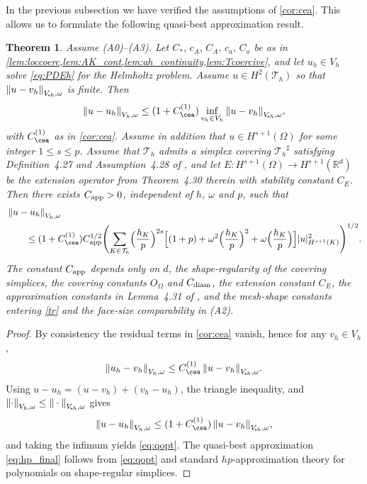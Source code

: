 \documentclass[11pt]{article}
\newenvironment{eqs} %
 { \begin{equation} \begin{aligned} } %
 { \end{aligned} \end{equation} \ignorespacesafterend } %
\theoremstyle{definition}
\theoremstyle{plain}
\newtheorem{theorem}{Theorem}[section]
\newcommand{\CA}{C_A}
\newcommand{\Ca}{C_a}
\newcommand{\ca}{c_a}
\newcommand{\cA}{c_A}
\newcommand{\CD}{C_*}
\newcommand{\Vsh}{V_{\!\star \hspace*{-0.2mm}h}}
\newcommand{\dgonorm}[1]{\norm{#1}_{V_h,\omega}}
\newcommand{\tdgonorm}[1]{{\Vert#1\Vert}_{\Vsh,\omega}}
\newcommand{\Th}{{\calT_h}}
\newcommand*{\norm}[1]{\left\|#1\right\|}
\newcommand{\IR}{\mathbb{R}}
\newcommand{\calT}{\mathcal{T}}
\begin{document}
In the previous subsection we have verified the assumptions of \cref{cor:cea}. This allows us to formulate the following quasi-best approximation result. 

\begin{theorem}\label{thm:best_approx}
Assume \textup{(A0)}--\textup{(A3)}.
Let $\CD,\,\cA,\,\CA,\,\ca,\,\Ca$ be as in \cref{lem:loccoerc,lem:AK_cont,lem:ah_continuity,lem:Tcoercive}, and let $u_h\in V_h$ solve \eqref{eq:PDEh} for the Helmholtz problem.
Assume $u\in H^2(\Th)$ so that $\tdgonorm{u-v_h}$ is finite.
Then
\begin{equation}\label{eq:qopt}
\dgonorm{u-u_h}
\le
(1+C_{\cea}^{(1)}) 
\inf_{v_h\in V_h}\tdgonorm{u-v_h},
\end{equation}
with $C_{\cea}^{(1)}$ as in \cref{cor:cea}.
\medskip
Assume in addition that $u\in H^{s+1}(\Omega)$ for some integer $1\le s\le p$.
Assume that $\Th$ admits a simplex covering $\Th^\sharp$ satisfying Definition~4.27 and Assumption~4.28 of \cite{CDG22}, and let $E:H^{s+1}(\Omega)\to H^{s+1}(\IR^d)$ be the extension operator from Theorem~4.30 therein with stability constant $C_E$.
Then there exists $C_{\rm app}>0$, independent of $h$, $\omega$ and $p$, such that
\begin{eqs}\label{eq:hp_final}
&\dgonorm{u-u_h}\\
&\qquad\le
(1+C_{\cea}^{(1)}) C_{\rm app}^{1/2}
\Biggl(
\sum_{K\in\Th}
\Bigl(\frac{h_K}{p}\Bigr)^{2s}
\Bigl[
(1+p)
+\omega^2\Bigl(\frac{h_K}{p}\Bigr)^{2}
+\omega \Bigl(\frac{h_K}{p}\Bigr)
\Bigr] 
|u|_{H^{s+1}(K)}^2
\Biggr)^{1/2}.
\end{eqs}
The constant $C_{\rm app}$ depends only on $d$, the shape-regularity of the covering simplices, the covering
constants $O_\Omega$ and $C_{\rm diam}$, the extension constant $C_E$, the approximation constants in
Lemma~4.31 of \cite{CDG22}, and the mesh-shape constants entering \eqref{tr} and the face-size comparability in
\textup{(A2)}.
\end{theorem}
\begin{proof}
By consistency the residual terms in \cref{cor:cea} vanish, hence for any $v_h\in V_h$,
\[
    \dgonorm{u_h-v_h}\le C_{\cea}^{(1)}\,\tdgonorm{u-v_h}.
\]
Using $u-u_h=(u-v_h)+(v_h-u_h)$, the triangle inequality, and $\dgonorm{\cdot}\le \tdgonorm{\cdot}$ gives
\[
    \dgonorm{u-u_h}\le (1+C_{\cea}^{(1)})\,\tdgonorm{u-v_h},
\]
and taking the infimum yields \eqref{eq:qopt}. The quasi-best approximation \eqref{eq:hp_final} follows from \eqref{eq:qopt} and standard $hp$-approximation theory for polynomials on shape-regular simplices.
\end{proof}
\end{document}
